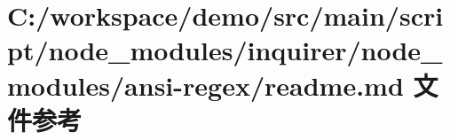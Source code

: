 \hypertarget{node__modules_2inquirer_2node__modules_2ansi-regex_2_r_e_a_d_m_e_8md}{}\section{C\+:/workspace/demo/src/main/script/node\+\_\+modules/inquirer/node\+\_\+modules/ansi-\/regex/readme.md 文件参考}
\label{node__modules_2inquirer_2node__modules_2ansi-regex_2_r_e_a_d_m_e_8md}
